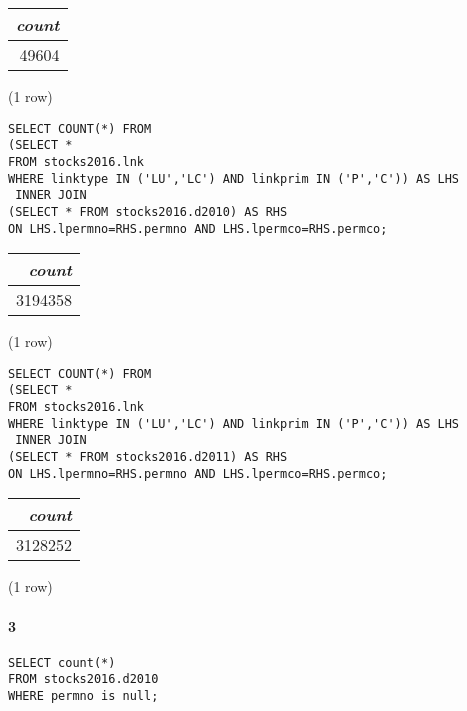 \documentclass[]{article}
\let\oldparagraph\paragraph
\renewcommand{\paragraph}[1]{\oldparagraph{#1}\mbox{}}
\begin{document}
\begin{center}
\begin{tabular}{r}
\textit{count} \\
\hline
49604 \\
\end{tabular}

\noindent (1 row) \\
\end{center}

\color{blue}
\begin{verbatim}
SELECT COUNT(*) FROM
(SELECT *
FROM stocks2016.lnk
WHERE linktype IN ('LU','LC') AND linkprim IN ('P','C')) AS LHS
 INNER JOIN
(SELECT * FROM stocks2016.d2010) AS RHS
ON LHS.lpermno=RHS.permno AND LHS.lpermco=RHS.permco;
\end{verbatim}
\color{black}

\begin{center}
\begin{tabular}{r}
\textit{count} \\
\hline
3194358 \\
\end{tabular}

\noindent (1 row) \\
\end{center}

\color{blue}
\begin{verbatim}
SELECT COUNT(*) FROM
(SELECT *
FROM stocks2016.lnk
WHERE linktype IN ('LU','LC') AND linkprim IN ('P','C')) AS LHS
 INNER JOIN
(SELECT * FROM stocks2016.d2011) AS RHS
ON LHS.lpermno=RHS.permno AND LHS.lpermco=RHS.permco;
\end{verbatim}
\color{black}

\begin{center}
\begin{tabular}{r}
\textit{count} \\
\hline
3128252 \\
\end{tabular}

\noindent (1 row) \\
\end{center}


\paragraph{3} 

\color{blue}
\begin{verbatim}
SELECT count(*)
FROM stocks2016.d2010
WHERE permno is null;
\end{verbatim}
\color{black}
\end{document}

